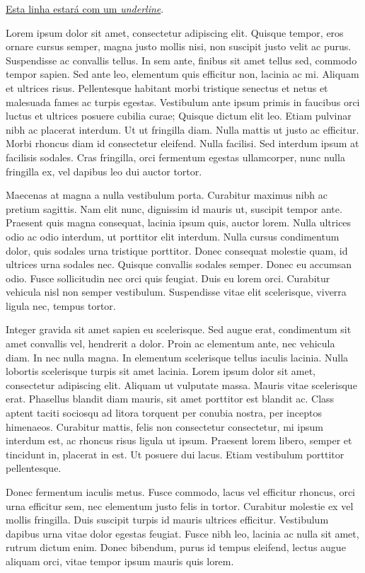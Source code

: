 \underline{Esta linha estará com um \textit{underline}}.

Lorem ipsum dolor sit amet, consectetur adipiscing elit. Quisque tempor, eros ornare cursus semper, magna justo mollis nisi, non suscipit justo velit ac purus. Suspendisse ac convallis tellus. In sem ante, finibus sit amet tellus sed, commodo tempor sapien. Sed ante leo, elementum quis efficitur non, lacinia ac mi. Aliquam et ultrices risus. Pellentesque habitant morbi tristique senectus et netus et malesuada fames ac turpis egestas. Vestibulum ante ipsum primis in faucibus orci luctus et ultrices posuere cubilia curae; Quisque dictum elit leo. Etiam pulvinar nibh ac placerat interdum. Ut ut fringilla diam. Nulla mattis ut justo ac efficitur. Morbi rhoncus diam id consectetur eleifend. Nulla facilisi. Sed interdum ipsum at facilisis sodales. Cras fringilla, orci fermentum egestas ullamcorper, nunc nulla fringilla ex, vel dapibus leo dui auctor tortor.

Maecenas at magna a nulla vestibulum porta. Curabitur maximus nibh ac pretium sagittis. Nam elit nunc, dignissim id mauris ut, suscipit tempor ante. Praesent quis magna consequat, lacinia ipsum quis, auctor lorem. Nulla ultrices odio ac odio interdum, ut porttitor elit interdum. Nulla cursus condimentum dolor, quis sodales urna tristique porttitor. Donec consequat molestie quam, id ultrices urna sodales nec. Quisque convallis sodales semper. Donec eu accumsan odio. Fusce sollicitudin nec orci quis feugiat. Duis eu lorem orci. Curabitur vehicula nisl non semper vestibulum. Suspendisse vitae elit scelerisque, viverra ligula nec, tempus tortor.

Integer gravida sit amet sapien eu scelerisque. Sed augue erat, condimentum sit amet convallis vel, hendrerit a dolor. Proin ac elementum ante, nec vehicula diam. In nec nulla magna. In elementum scelerisque tellus iaculis lacinia. Nulla lobortis scelerisque turpis sit amet lacinia. Lorem ipsum dolor sit amet, consectetur adipiscing elit. Aliquam ut vulputate massa. Mauris vitae scelerisque erat. Phasellus blandit diam mauris, sit amet porttitor est blandit ac. Class aptent taciti sociosqu ad litora torquent per conubia nostra, per inceptos himenaeos. Curabitur mattis, felis non consectetur consectetur, mi ipsum interdum est, ac rhoncus risus ligula ut ipsum. Praesent lorem libero, semper et tincidunt in, placerat in est. Ut posuere dui lacus. Etiam vestibulum porttitor pellentesque.

Donec fermentum iaculis metus. Fusce commodo, lacus vel efficitur rhoncus, orci urna efficitur sem, nec elementum justo felis in tortor. Curabitur molestie ex vel mollis fringilla. Duis suscipit turpis id mauris ultrices efficitur. Vestibulum dapibus urna vitae dolor egestas feugiat. Fusce nibh leo, lacinia ac nulla sit amet, rutrum dictum enim. Donec bibendum, purus id tempus eleifend, lectus augue aliquam orci, vitae tempor ipsum mauris quis lorem.

